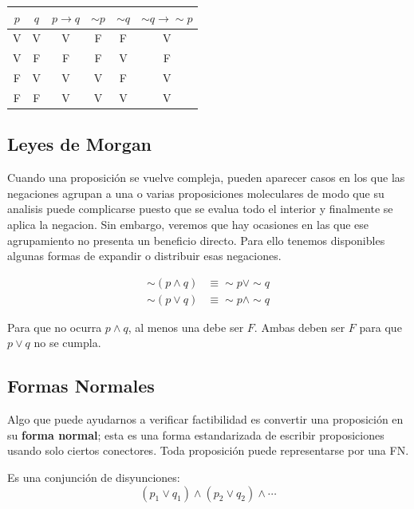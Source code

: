 \documentclass{book}
\begin{document}
  \begin{tabular}{c|c|c|c|c|c}
  $p$ & $q$ & $p \to q$ & $\sim p$ & $\sim q$ & $\sim q \to \sim p$ \\
  \hline
  V & V & V & F & F & V \\
  V & F & F & F & V & F \\
  F & V & V & V & F & V \\
  F & F & V & V & V & V \\
  \end{tabular}
  
  \subsection{Leyes de Morgan}
  
  Cuando una proposición se vuelve compleja, pueden aparecer casos en los que las negaciones
  agrupan a una o varias proposiciones moleculares de modo que su analisis puede complicarse
  puesto que se evalua todo el interior y finalmente se aplica la negacion. Sin embargo, veremos
  que hay ocasiones en las que ese agrupamiento no presenta un beneficio directo. Para ello
  tenemos disponibles algunas formas de expandir o distribuir esas negaciones.
  
  \begin{theorem}[title=Leyes de De Morgan]
    \begin{align}
      \sim(p \land q) &\equiv \sim p \lor \sim q \\
      \sim(p \lor q)  &\equiv \sim p \land \sim q
    \end{align}
  \end{theorem}
  
  Para que no ocurra $p \land q$, al menos una debe ser $F$.
  Ambas deben ser $F$ para que $p \lor q$ no se cumpla.
  
  \subsection{Formas Normales}
  
  Algo que puede ayudarnos a verificar factibilidad es convertir una proposición en su
  \textbf{forma normal}; esta es una forma estandarizada de escribir proposiciones usando
  solo ciertos conectores. Toda proposición puede representarse por una FN.
  
  \begin{minipage}{0.45\textwidth}
    \begin{definition}[title=FND — Forma Normal Disyuntiva]
      Es una conjunción de disyunciones:
      \begin{equation}
        (p_1 \lor q_1) \land (p_2 \lor q_2) \land \cdots
      \end{equation}
    \end{definition}
  \end{minipage}
  
\end{document}
